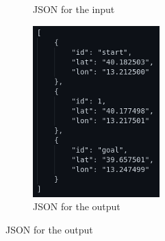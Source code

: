 \documentclass[journal,article,submit,pdftex,moreauthors]{Definitions/mdpi}
\begin{document}
\begin{figure}[h]
\begin{subfigure}{0.3\textwidth}
		\caption{JSON for the input}
		\label{fig:jsonIN}
	\end{subfigure}
	\begin{subfigure}{0.3\textwidth}
		\centering
		\includegraphics[width=\textwidth]{res/imgs/MQTT_out.png}
		\caption{JSON for the output}
		\label{fig:jsonOut}
	\end{subfigure}
\end{figure}
\end{document}
